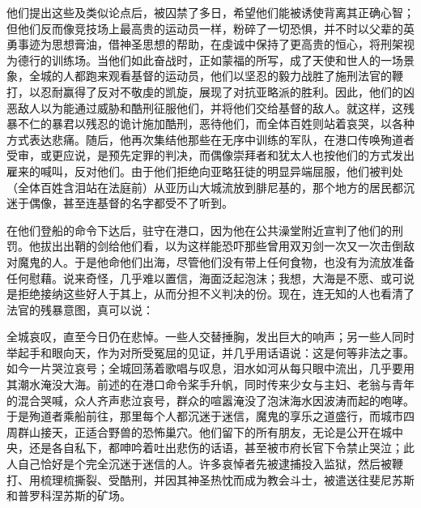 他们提出这些及类似论点后，被囚禁了多日，希望他们能被诱使背离其正确心智；但他们反而像竞技场上最高贵的运动员一样，粉碎了一切恐惧，并不时以父辈的英勇事迹为思想膏油，借神圣思想的帮助，在虔诚中保持了更高贵的恒心，将刑架视为德行的训练场。当他们如此奋战时，正如蒙福的所写，成了天使和世人的一场景象，全城的人都跑来观看基督的运动员，他们以坚忍的毅力战胜了施刑法官的鞭打，以忍耐赢得了反对不敬虔的凯旋，展现了对抗亚略派的胜利。因此，他们的凶恶敌人以为能通过威胁和酷刑征服他们，并将他们交给基督的敌人。就这样，这残暴不仁的暴君以残忍的诡计施加酷刑，恶待他们，而全体百姓则站着哀哭，以各种方式表达悲痛。随后，他再次集结他那些在无序中训练的军队，在港口传唤殉道者受审，或更应说，是预先定罪的判决，而偶像崇拜者和犹太人也按他们的方式发出雇来的喊叫，反对他们。由于他们拒绝向亚略狂徒的明显异端屈服，他们被判处（全体百姓含泪站在法庭前）从亚历山大城流放到腓尼基的，那个地方的居民都沉迷于偶像，甚至连基督的名字都受不了听到。\par

在他们登船的命令下达后，驻守在港口，因为他在公共澡堂附近宣判了他们的刑罚。他拔出出鞘的剑给他们看，以为这样能恐吓那些曾用双刃剑一次又一次击倒敌对魔鬼的人。于是他命他们出海，尽管他们没有带上任何食物，也没有为流放准备任何慰藉。说来奇怪，几乎难以置信，海面泛起泡沫；我想，大海是不愿、或可说是拒绝接纳这些好人于其上，从而分担不义判决的份。现在，连无知的人也看清了法官的残暴意图，真可以说：\par

全城哀叹，直至今日仍在悲悼。一些人交替捶胸，发出巨大的响声；另一些人同时举起手和眼向天，作为对所受冤屈的见证，并几乎用话语说：这是何等非法之事。如今一片哭泣哀号；全城回荡着歌唱与叹息，泪水如河从每只眼中流出，几乎要用其潮水淹没大海。前述的在港口命令桨手升帆，同时传来少女与主妇、老翁与青年的混合哭喊，众人齐声悲泣哀号，群众的喧嚣淹没了泡沫海水因波涛而起的咆哮。于是殉道者乘船前往，那里每个人都沉迷于迷信，魔鬼的享乐之道盛行，而城市四周群山接天，正适合野兽的恐怖巢穴。他们留下的所有朋友，无论是公开在城中央，还是各自私下，都呻吟着吐出悲伤的话语，甚至被市府长官下令禁止哭泣；此人自己恰好是个完全沉迷于迷信的人。许多哀悼者先被逮捕投入监狱，然后被鞭打、用梳理梳撕裂、受酷刑，并因其神圣热忱而成为教会斗士，被遣送往斐尼苏斯和普罗科涅苏斯的矿场。\newline{}\par

